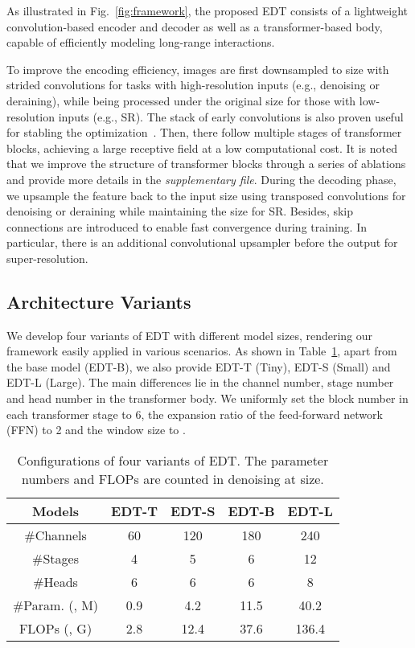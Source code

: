 \documentclass[runningheads]{llncs}
\makeatletter
\newcommand*{\eg}{e.g.\@\xspace}
\makeatother
\begin{document}
	As illustrated in Fig.~\ref{fig:framework}, the proposed EDT consists of a lightweight convolution-based encoder and decoder as well as a transformer-based body, capable of efficiently modeling long-range interactions. 

	To improve the encoding efficiency, images are first downsampled to  size with strided convolutions for tasks with high-resolution inputs (\eg, denoising or deraining), while being processed under the original size for those with low-resolution inputs (\eg, SR). The stack of early convolutions is also proven useful for stabling the optimization~\cite{xiao2021early}. Then, there follow multiple stages of transformer blocks, achieving a large receptive field at a low computational cost. It is noted that we improve the structure of transformer blocks through a series of ablations and provide more details in the \textit{supplementary file}. During the decoding phase, we upsample the feature back to the input size using transposed convolutions for denoising or deraining while maintaining the size for SR. Besides, skip connections are introduced to enable fast convergence during training. In particular, there is an additional convolutional upsampler before the output for super-resolution. 
	
	\subsection{Architecture Variants}
	We develop four variants of EDT with different model sizes, rendering our framework easily applied in various scenarios. As shown in Table~\ref{tab:conf}, apart from the base model (EDT-B), we also provide EDT-T (Tiny), EDT-S (Small) and EDT-L (Large). The main differences lie in the channel number, stage number and head number in the transformer body. We uniformly set the block number in each transformer stage to 6, the expansion ratio of the feed-forward network (FFN) to 2 and the window size to . 

	\begin{table}[t]
		\caption{Configurations of four variants of EDT. The parameter numbers and FLOPs are counted in denoising at  size.}
		\renewcommand\arraystretch{1.0}
\begin{center}
\begin{tabular}{|c | c | c | c | c |}
				\hline
				Models & EDT-T & EDT-S & EDT-B & EDT-L \\
				\hline
				\#Channels & 60 & 120 & 180 & 240 \\
				\#Stages & 4 & 5 & 6 & 12 \\
\#Heads & 6 & 6 & 6 & 8 \\
				\hline
				\#Param. (, M) & 0.9 & 4.2 & 11.5 & 40.2 \\
				FLOPs (, G) & 2.8 & 12.4 & 37.6 &  136.4 \\
				\hline      
			\end{tabular}
\end{center}
\vspace{-0.3in}
		\label{tab:conf}
	\end{table}
	
\end{document}
